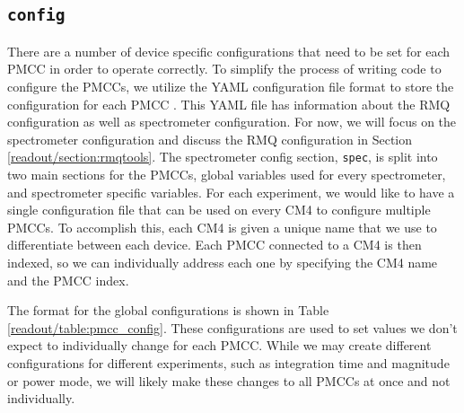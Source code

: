\subsection{\texttt{config}}
There are a number of device specific configurations that need to be set for each PMCC in order to operate correctly.
To simplify the process of writing code to configure the PMCCs, we utilize the YAML configuration file format to store the configuration for each PMCC \parencite{yaml}.
This YAML file has information about the RMQ configuration as well as spectrometer configuration. 
For now, we will focus on the spectrometer configuration and discuss the RMQ configuration in Section \ref{readout/section:rmqtools}.
The spectrometer config section, \texttt{spec}, is split into two main sections for the PMCCs, global variables used for every spectrometer, and spectrometer specific variables.
For each experiment, we would like to have a single configuration file that can be used on every CM4 to configure multiple PMCCs. 
To accomplish this, each CM4 is given a unique name that we use to differentiate between each device. 
Each PMCC connected to a CM4 is then indexed, so we can individually address each one by specifying the CM4 name and the PMCC index.

The format for the global configurations is shown in Table \ref{readout/table:pmcc_config}.
These configurations are used to set values we don't expect to individually change for each PMCC.
While we may create different configurations for different experiments, such as integration time and magnitude or power mode, we will likely make these changes to all PMCCs at once and not individually.

